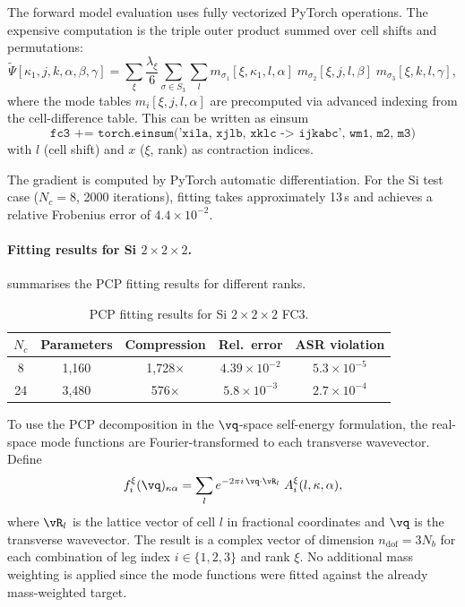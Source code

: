 The forward model evaluation uses fully vectorized PyTorch operations.
The expensive computation is the triple outer product summed over cell shifts
and permutations:
\begin{equation}
  \tilde{\Psi}[\kappa_1, j, k, \alpha, \beta, \gamma]
  = \sum_{\xi}
    \frac{\lambda_\xi}{6}
    \sum_{\sigma \in S_3}
    \sum_l
    m_{\sigma_1}[\xi, \kappa_1, l, \alpha]\;
    m_{\sigma_2}[\xi, j, l, \beta]\;
    m_{\sigma_3}[\xi, k, l, \gamma],
\end{equation}
where the mode tables $m_i[\xi, j, l, \alpha]$ are precomputed via
advanced indexing from the cell-difference table.  This can be written as einsum
\begin{equation*}
  \texttt{fc3 += torch.einsum('xila, xjlb, xklc -> ijkabc', wm1, m2, m3)}
\end{equation*}
with $l$ (cell shift) and $x$ ($\xi$, rank) as contraction indices.

The gradient is computed by PyTorch automatic differentiation.  For the
Si test case ($N_c = 8$, 2000 iterations), fitting takes approximately
13\,s and achieves a relative Frobenius error of $4.4 \times 10^{-2}$.

\paragraph{Fitting results for Si $2\times2\times2$.}
 summarises the PCP fitting results for different
ranks.

\begin{table}[h]
\centering
\caption{PCP fitting results for Si $2\times2\times2$ FC3.}
\label{tab:pcp_fit}
\begin{tabular}{ccccc}
  \toprule
  $N_c$ & Parameters & Compression & Rel.\ error & ASR violation \\
  \midrule
  8  & 1{,}160  & 1{,}728$\times$ & $4.39\times10^{-2}$ & $5.3\times10^{-5}$ \\
  24 & 3{,}480  & 576$\times$     & $5.8\times10^{-3}$  & $2.7\times10^{-4}$ \\
  \bottomrule
\end{tabular}
\end{table}

To use the PCP decomposition in the $\vq$-space self-energy formulation,
the real-space mode functions are Fourier-transformed to each transverse
wavevector.  Define
\begin{equation}\label{eq:pcp_ft}
  f_i^{\xi}(\vq)_{\kappa\alpha}
  = \sum_l
    e^{-2\pi i\, \vq \cdot \vR_l}\;
    A_i^{\xi}(l, \kappa, \alpha),
\end{equation}
where $\vR_l$ is the lattice vector of cell $l$ in fractional
coordinates and $\vq$ is the transverse wavevector.  The result is a
complex vector of dimension $n_\mathrm{dof} = 3N_b$ for each
combination of leg index $i \in \{1,2,3\}$ and rank $\xi$.  No
additional mass weighting is applied since the mode functions were
fitted against the already mass-weighted target.

